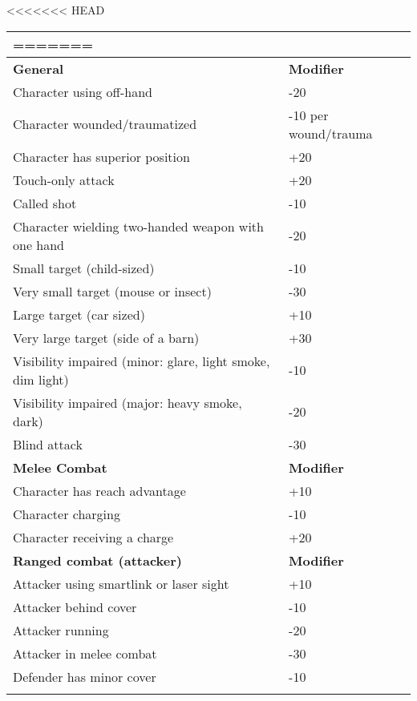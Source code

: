\begin{table}
<<<<<<< HEAD
\begin{tabular}{|l|l|} %
=======
\begin{tabularx}{\textwidth}{|X|l|}
>>>>>>> 069efc938e743c2e1f7048421dcd3e53a984f73e
\hline
\multicolumn{2}{|c|}{\textbf{Combat modifiers}}			\\
\hline
\textbf{General} 					& \textbf{Modifier}		\\
\hline
Character using off-hand				& -20				\\
\hline
Character wounded/traumatized			& -10 per wound/trauma	\\
\hline
Character has superior position		& +20				\\
\hline
Touch-only attack					& +20				\\
\hline
Called shot						& -10				\\
\hline
Character wielding two-handed weapon with one hand & -20		\\
\hline
Small target (child-sized)			& -10				\\
\hline
Very small target (mouse or insect)	& -30				\\
\hline
Large target (car sized) 			& +10				\\
\hline
Very large target (side of a barn) 	& +30				\\
\hline
Visibility impaired (minor: glare, light smoke, dim light) & -10	\\
\hline
Visibility impaired (major: heavy smoke, dark) & -20			\\
\hline
Blind attack 						& -30				\\
\hline
\textbf{Melee Combat} 				& \textbf{Modifier}		\\
\hline
Character has reach advantage 		& +10				\\
\hline
Character charging 					& -10				\\
\hline
Character receiving a charge 			& +20				\\
\hline
\textbf{Ranged combat (attacker)} 		& \textbf{Modifier}		\\
\hline
Attacker using smartlink or laser sight	& +10				\\
\hline
Attacker behind cover 				& -10				\\
\hline
Attacker running 					& -20				\\
\hline
Attacker in melee combat 			& -30				\\
\hline
Defender has minor cover 			& -10				\\

\end{tabularx}
\end{tabular}
\end{table}

